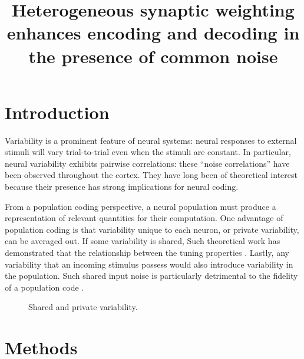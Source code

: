 \documentclass[11pt]{article}
\title{Heterogeneous synaptic weighting enhances encoding and decoding in the presence of common noise}
\date{}
\begin{document}
	\maketitle
	
	\section{Introduction}
	Variability is a prominent feature of neural systems: neural responses to external stimuli will vary trial-to-trial even when the stimuli are constant. In particular, neural variability exhibits pairwise correlations: these ``noise correlations'' have been observed throughout the cortex. They have long been of theoretical interest because their presence has strong implications for neural coding.
	
	From a population coding perspective, a neural population must produce a representation of relevant quantities for their computation. One advantage of population coding is that variability unique to each neuron, or private variability, can be averaged out. If some variability is shared, Such theoretical work has demonstrated that the relationship between the tuning properties . Lastly, any variability that an incoming stimulus possess would also introduce variability in the population. Such shared input noise is particularly detrimental to the fidelity of a population code \cite{Moreno-Bote2014, Kanitscheider2015}.
	
	\begin{figure}[b]
		\centering
		\caption{Shared and private variability.}
		\label{fig:private-shared}
	\end{figure}
	\newpage 
	
	\section{Methods}
\end{document}
